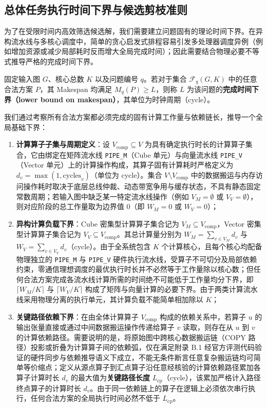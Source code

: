 \documentclass[anonymous,notoc]{gmcm2026}
\providecommand{\tightlist}{\setlength{\itemsep}{0pt}\setlength{\parskip}{0pt}}
\begin{document}
\subsection{总体任务执行时间下界与候选剪枝准则}

为了在受限时间内高效筛选候选解，我们需要建立问题固有的理论时间下界。在异构流水线与多核心调度中，简单的贪心启发式排程容易引发多处理器调度异例（例如增加资源或减少局部耗时反而增大全局完成时间）\cite{ref2}；因此需要结合物理必要不等式推导严格的完成时间下界。

固定输入图 \(G\)、核心总数 \(K\) 以及问题编号 \(q\)。若对于集合 \(\mathcal{F}_q(G, K)\) 中的任意合法方案 \(P\)，其 Makespan 均满足 \(M_q(P) \ge L\)，则称 \(L\) 为该问题的\textbf{完成时间下界（lower bound on makespan）}，其单位为时钟周期（cycle）。

我们通过考察所有合法方案都必须完成的固有计算工作量与依赖链长，推导一个全局基础下界：

\begin{enumerate}
\def\labelenumi{\arabic{enumi}.}
\tightlist
\item
  \textbf{计算算子子集与周期定义}：设 \(V_{\mathrm{comp}} \subseteq V\) 为具有确定执行时长的计算算子集合，它由绑定在矩阵流水线 \texttt{PIPE\_M}（Cube 单元）与向量流水线 \texttt{PIPE\_V}（Vector 单元）上的计算操作构成，其算子固有计算耗时严格定义为 \(d_v = \max(1, \text{cycles}_v)\)（单位为 cycle）。集合 \(V \setminus V_{\mathrm{comp}}\) 中的数据搬运与内存访问操作耗时取决于底层总线仲裁、动态带宽争用与缓存状态，不具有静态固定常数周期；若输入图中缺乏某一特定流水线操作（例如 \(V_M = \emptyset\) 或 \(V_V = \emptyset\)），则对应阶段的总工作量取为边界值 0（即 \(W_M = 0\) 或 \(W_V = 0\)）；
\item
  \textbf{异构计算负载下界}：Cube 密集型计算算子集合记为 \(V_M \subseteq V_{\mathrm{comp}}\)，Vector 密集型计算算子集合记为 \(V_V \subseteq V_{\mathrm{comp}}\)。其总计算量分别为 \(W_M = \sum_{v \in V_M} d_v\) 与 \(W_V = \sum_{v \in V_V} d_v\)（cycle）。由于全系统包含 \(K\) 个计算核心，且每个核心均配备物理独立的 \texttt{PIPE\_M} 与 \texttt{PIPE\_V} 硬件执行流水线，受算子不可切分及局部依赖约束，零通信理想调度的最优执行时长并不必然等于工作量除以核心数；但任何合法方案完成各流水线计算所需的时间绝不可能低于工作量均分下界，即 \(\lceil W_M / K \rceil\) 与 \(\lceil W_V / K \rceil\) 构成了矩阵与向量计算的必要下界。由于两类计算流水线采用物理分离的执行单元，其计算负载不能简单相加除以 \(K\)；
\item
  \textbf{关键路径依赖下界}：在由全体计算算子 \(V_{\mathrm{comp}}\) 构成的依赖关系中，若算子 \(u\) 的输出张量直接或通过中间数据搬运操作传递给算子 \(v\) 读取，则存在从 \(u\) 到 \(v\) 的计算依赖路径。需要说明的是，将原始图中跨核心数据搬运链（COPY 路径）投影或折叠为计算算子间的依赖弧，仅在满足附录 B.1 经官方评测代码验证的硬件同步与依赖推导语义下成立，不能无条件断言任意复杂搬运链均可简单等价缩点；定义从源点算子到汇点算子沿任意经核验的计算依赖路径累加各算子计算时长 \(d_v\) 的最大值为\textbf{关键路径长度} \(L_{\mathrm{cp}}\)（cycle），该累加严格计入路径终点算子的计算时长 \(d_v\)。由于同一依赖链上的算子在逻辑上必须依次串行执行，任何合法方案的全局执行时间必然不低于 \(L_{\mathrm{cp}}\)。
\end{enumerate}
\end{document}
